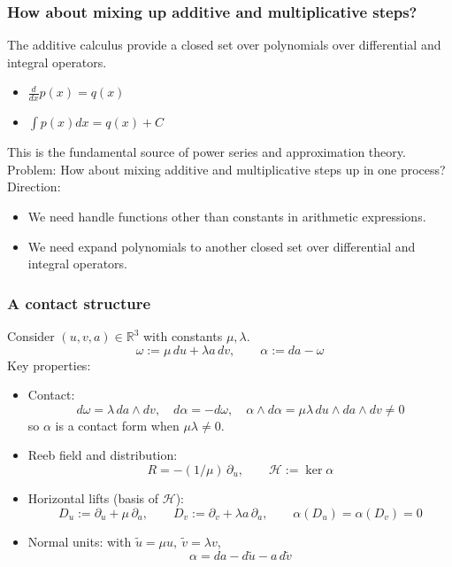 \documentclass[aspectratio=169]{beamer}
\begin{document}
\begin{frame}
    \frametitle{How about mixing up additive and multiplicative steps?}
    The additive calculus provide a closed set over polynomials over differential and integral operators.
    \begin{itemize}
        \item $\frac{d}{dx} p(x) = q(x)$
        \item $\int p(x) dx = q(x) + C$
    \end{itemize}
    This is the fundamental source of power series and approximation theory.
    \newline\newline
    Problem: How about mixing additive and multiplicative steps up in one process?
    \newline\newline
    Direction:
    \begin{itemize}
        \item We need handle functions other than constants in arithmetic expressions.
        \item We need expand polynomials to another closed set over differential and integral operators.
    \end{itemize}
\end{frame}

\begin{frame}
    \frametitle{A contact structure}
    Consider $(u,v,a)\in\mathbb{R}^3$ with constants $\mu,\lambda$.
    \[
      \omega := \mu\,du + \lambda a\,dv,\qquad \alpha := da - \omega
    \]
    Key properties:
    \begin{itemize}
      \item Contact:
      \[
        d\omega=\lambda\,da\wedge dv,\quad d\alpha=-d\omega,\quad
        \alpha\wedge d\alpha=\mu\lambda\,du\wedge da\wedge dv\neq 0
      \]
      so $\alpha$ is a contact form when $\mu\lambda\neq 0$.
      \item Reeb field and distribution:
      \[
        R=-(1/\mu)\,\partial_u,\qquad \mathcal{H}:=\ker\alpha
      \]
      \item Horizontal lifts (basis of $\mathcal{H}$):
      \[
        D_u:=\partial_u+\mu\,\partial_a,\qquad
        D_v:=\partial_v+\lambda a\,\partial_a,\qquad \alpha(D_u)=\alpha(D_v)=0
      \]
      \item Normal units: with $\tilde u=\mu u,\ \tilde v=\lambda v$,
      \[
        \alpha=da-d\tilde u-a\,d\tilde v
      \]
    \end{itemize}
\end{frame}
\end{document}
